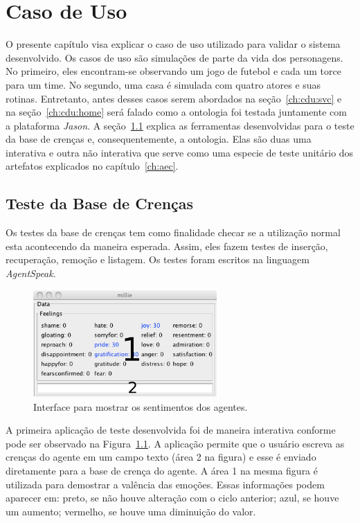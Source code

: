 \chapter{Caso de Uso} \label{ch:cdu}

O presente capítulo visa explicar o caso de uso utilizado para validar o
sistema desenvolvido. Os casos de uso são simulações de parte da vida dos
personagens. No primeiro, eles encontram-se observando um jogo de futebol e
cada um torce para um time. No segundo, uma casa é simulada com quatro atores
e suas rotinas. Entretanto, antes desses casos serem abordados na
seção~\ref{ch:cdu:svc} e na seção~\ref{ch:cdu:home}
será falado como a ontologia foi testada juntamente com a plataforma
\emph{Jason}. A seção~\ref{ch:cdu:tbc} explica as ferramentas desenvolvidas
para o teste da base de crenças e, consequentemente, a ontologia. Elas são duas
uma interativa e outra não interativa que serve como uma especie de teste
unitário dos artefatos explicados no capítulo~\ref{ch:aec}.

\section{Teste da Base de Crenças} \label{ch:cdu:tbc}

Os testes da base de crenças tem como finalidade checar se a utilização normal
esta acontecendo da maneira esperada. Assim, eles fazem testes de inserção,
recuperação, remoção e listagem. Os testes foram escritos na linguagem
\emph{AgentSpeak}.

\begin{figure}
	\begin{center}
		\includegraphics[width=70mm]{figuras/introductionDF.png}
	\end{center}
	\caption{Interface para mostrar os sentimentos dos agentes.}
	\label{fig:introducaoDF}
\end{figure}

A primeira aplicação de teste desenvolvida foi de maneira interativa conforme
pode ser observado na Figura~\ref{fig:introducaoDF}. A aplicação permite que o
usuário escreva as crenças do agente em um campo texto (área 2 na figura) e
esse é enviado diretamente para a base de crença do agente. A área 1 na mesma
figura é utilizada para demostrar a valência das emoções.
Essas informações podem aparecer em: preto, se não houve alteração com o ciclo
anterior; azul, se houve um aumento; vermelho, se houve uma diminuição do
valor.


